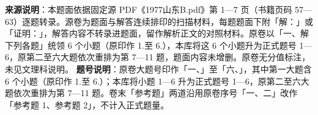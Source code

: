 


\begin{gktip}
\textbf{来源说明}：本题面依据固定源 PDF《1977山东B.pdf》第 1—7 页（书籍页码 57—63）逐题转录。源卷为题面与解答连续排印的扫描材料，每题题面下附「解：」或「证明：」，解答内容不转录进题面，留作解析正文的对照材料。原卷以「一、解下列各题」统领 6 个小题（原印作 1.至 6.），本库将这 6 个小题升为正式题号 1—6，原第二至六大题依次重排为第 7—11 题，题面内容未增删。原卷无分值标注，未见文理科说明。
\textbf{题号说明}：原卷大题号印作「一、」至「六、」，其中第一大题含 6 个小题（原印作 1.至 6.）；本库将小题 1—6 升为正式题号 1—6，原第二至六大题依次重排为第 7—11 题。卷末「参考题」两道沿用原卷序号「一、二」改作「参考题 1、参考题 2」，不计入正式题量。
\end{gktip}

\par\medskip

